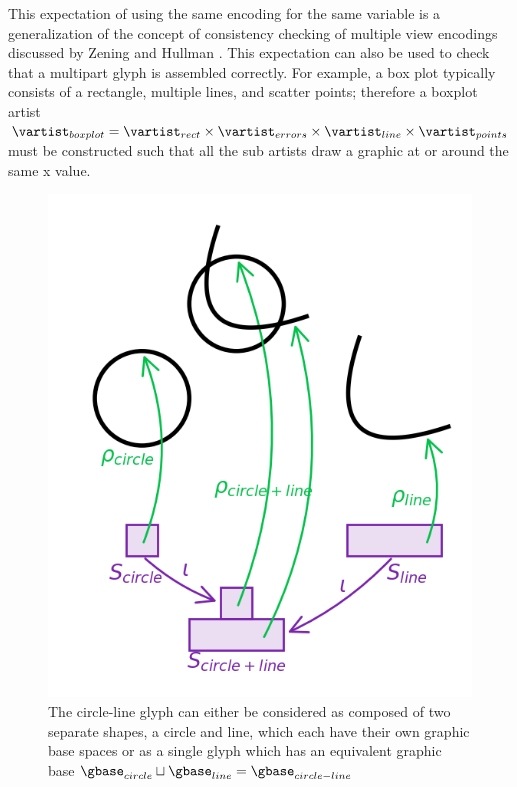 \documentclass[10pt,journal,compsoc]{IEEEtran}
\theoremstyle{definition}
\theoremstyle{remark}
\begin{document}
This expectation of using the same encoding for the same variable is a generalization of the concept of consistency checking of multiple view encodings discussed by Zening and Hullman \cite{hullmanKeeping2018}. This expectation can also be used to check that a multipart glyph is assembled correctly. For example, a box plot \cite{wickham40YearsBoxplots2011} typically consists of a rectangle, multiple lines, and scatter points; therefore a boxplot artist $\vartist_{boxplot} = \vartist_{rect} \times \vartist_{errors} \times \vartist_{line} \times \vartist_{points}$ must be constructed such that all the sub artists draw a graphic at or around the same x value. 

\begin{figure}[h!]
  \includegraphics*[width=1\columnwidth]{qcom.png}
  \caption{The circle-line glyph can either be considered as composed of two separate shapes, a circle and line, which each have their own graphic base spaces or as a single glyph which has an equivalent graphic base  $\gbase_{circle} \sqcup \gbase_{line} = \gbase_{circle-line}$  \label{fig:artist:operator}}
\end{figure}
\end{document}
